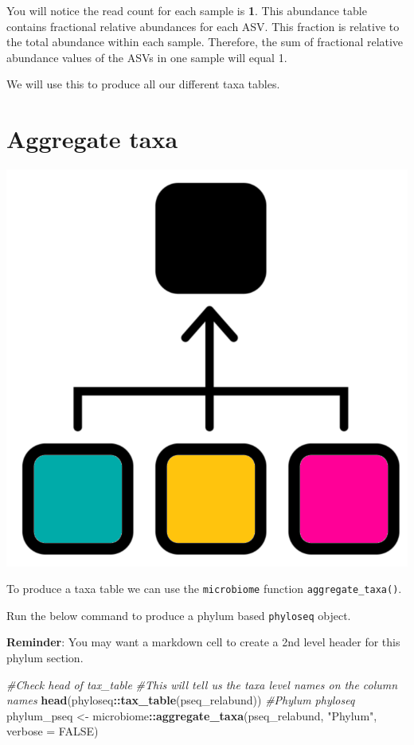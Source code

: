 \documentclass[
]{book}
\newenvironment{Shaded}{\begin{snugshade}}{\end{snugshade}}
\newcommand{\AttributeTok}[1]{\textcolor[rgb]{0.13,0.29,0.53}{#1}}
\newcommand{\CommentTok}[1]{\textcolor[rgb]{0.56,0.35,0.01}{\textit{#1}}}
\newcommand{\ConstantTok}[1]{\textcolor[rgb]{0.56,0.35,0.01}{#1}}
\newcommand{\FunctionTok}[1]{\textcolor[rgb]{0.13,0.29,0.53}{\textbf{#1}}}
\newcommand{\NormalTok}[1]{#1}
\newcommand{\OtherTok}[1]{\textcolor[rgb]{0.56,0.35,0.01}{#1}}
\newcommand{\SpecialCharTok}[1]{\textcolor[rgb]{0.81,0.36,0.00}{\textbf{#1}}}
\newcommand{\StringTok}[1]{\textcolor[rgb]{0.31,0.60,0.02}{#1}}
\begin{document}
You will notice the read count for each sample is \textbf{1}. This abundance table contains fractional relative abundances for each ASV. This fraction is relative to the total abundance within each sample. Therefore, the sum of fractional relative abundance values of the ASVs in one sample will equal 1.

We will use this to produce all our different taxa tables.

\hypertarget{aggregate-taxa}{%
\section{Aggregate taxa}\label{aggregate-taxa}}

\includegraphics{figures/aggregate_taxa.png}

To produce a taxa table we can use the \texttt{microbiome} function \texttt{aggregate\_taxa()}.

Run the below command to produce a phylum based \texttt{phyloseq} object.

\textbf{Reminder}: You may want a markdown cell to create a 2nd level header for this phylum section.

\begin{Shaded}
\begin{Highlighting}[]
\CommentTok{\#Check head of tax\_table}
\CommentTok{\#This will tell us the taxa level names on the column names}
\FunctionTok{head}\NormalTok{(phyloseq}\SpecialCharTok{::}\FunctionTok{tax\_table}\NormalTok{(pseq\_relabund))}
\CommentTok{\#Phylum phyloseq}
\NormalTok{phylum\_pseq }\OtherTok{\textless{}{-}}\NormalTok{ microbiome}\SpecialCharTok{::}\FunctionTok{aggregate\_taxa}\NormalTok{(pseq\_relabund, }\StringTok{"Phylum"}\NormalTok{, }\AttributeTok{verbose =} \ConstantTok{FALSE}\NormalTok{)}
\end{Highlighting}
\end{Shaded}
\end{document}

